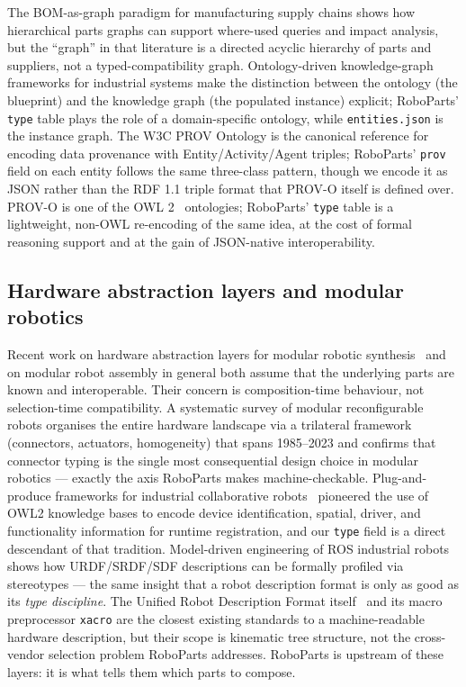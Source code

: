 \documentclass[11pt,twocolumn]{article}
\begin{document}
The BOM-as-graph paradigm for manufacturing supply chains
\cite{BOMGraph2024} shows how hierarchical parts graphs can support
where-used queries and impact analysis, but the ``graph'' in that
literature is a directed acyclic hierarchy of parts and suppliers,
not a typed-compatibility graph. Ontology-driven knowledge-graph
frameworks for industrial systems \cite{Ontology2024} make the
distinction between the ontology (the blueprint) and the knowledge
graph (the populated instance) explicit; RoboParts' \texttt{type}
table plays the role of a domain-specific ontology, while
\texttt{entities.json} is the instance graph. The W3C PROV Ontology
\cite{PROVO2013} is the canonical reference for encoding data provenance
with Entity/Activity/Agent triples; RoboParts' \texttt{prov} field
on each entity follows the same three-class pattern, though we
encode it as JSON rather than the RDF 1.1 triple format
\cite{RDF2014} that PROV-O itself is defined over. PROV-O is one of
the OWL 2~\cite{OWL2012} ontologies; RoboParts' \texttt{type} table
is a lightweight, non-OWL re-encoding of the same idea, at the cost
of formal reasoning support and at the gain of JSON-native
interoperability.

\subsection{Hardware abstraction layers and modular robotics}

Recent work on hardware abstraction layers for modular robotic
synthesis~\cite{R16} and on modular robot assembly in general both
assume that the underlying parts are known and interoperable. Their
concern is composition-time behaviour, not selection-time
compatibility. A systematic survey of modular reconfigurable robots
\cite{MRR2023} organises the entire hardware landscape via a trilateral
framework (connectors, actuators, homogeneity) that spans 1985--2023
and confirms that connector typing is the single most consequential
design choice in modular robotics — exactly the axis RoboParts makes
machine-checkable. Plug-and-produce frameworks for industrial
collaborative robots~\cite{SchouMadsen2017} pioneered the use of
OWL2 knowledge bases to encode device identification, spatial, driver,
and functionality information for runtime registration, and our
\texttt{type} field is a direct descendant of that tradition. Model-driven
engineering of ROS industrial robots~\cite{MDEROS2022} shows how
URDF/SRDF/SDF descriptions can be formally profiled via stereotypes —
the same insight that a robot description format is only as good as
its \emph{type discipline}. The Unified Robot Description Format
itself~\cite{URDF2023} and its macro preprocessor \texttt{xacro}
\cite{Xacro2023} are the closest existing standards to a
machine-readable hardware description, but their scope is
kinematic tree structure, not the cross-vendor selection problem
RoboParts addresses. RoboParts is upstream of these layers: it is what tells
them which parts to compose.
\end{document}
